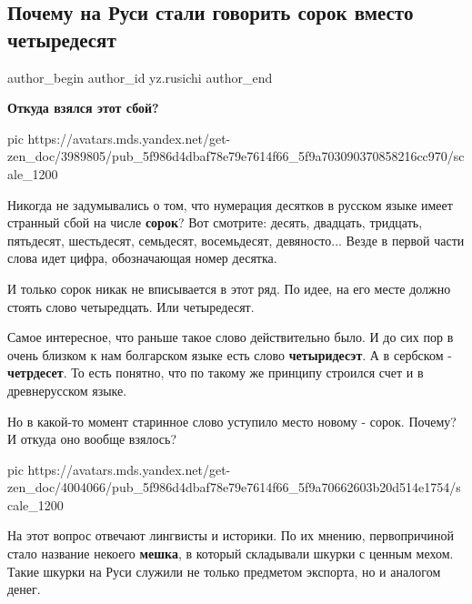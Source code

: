 
 
 
 
 
 
\subsection{Почему на Руси стали говорить сорок вместо четыредесят}
\label{sec:29_10_2020.sites.ru.zen_yandex.yz.rusichi.1.russia_sorok_pochemu}
\ifcmt
	author_begin
   author_id yz.rusichi
	author_end
\fi

{\bfseries 
Откуда взялся этот сбой?
}

\ifcmt
pic https://avatars.mds.yandex.net/get-zen_doc/3989805/pub_5f986d4dbaf78e79e7614f66_5f9a703090370858216cc970/scale_1200
\fi

Никогда не задумывались о том, что нумерация десятков в русском языке имеет
странный сбой на числе \textbf{сорок}? Вот смотрите: десять, двадцать, тридцать,
пятьдесят, шестьдесят, семьдесят, восемьдесят, девяносто... Везде в первой
части слова идет цифра, обозначающая номер десятка.

И только сорок никак не вписывается в этот ряд. По идее, на его месте должно
стоять слово четыредцать. Или четыредесят.

Самое интересное, что раньше такое слово действительно было. И до сих пор в
очень близком к нам болгарском языке есть слово \textbf{четыридесэт}. А в сербском -
\textbf{четрдесет}. То есть понятно, что по такому же принципу строился счет и в
древнерусском языке.

Но в какой-то момент старинное слово уступило место новому - сорок. Почему? И
откуда оно вообще взялось?

\ifcmt
pic https://avatars.mds.yandex.net/get-zen_doc/4004066/pub_5f986d4dbaf78e79e7614f66_5f9a70662603b20d514e1754/scale_1200
\fi

На этот вопрос отвечают лингвисты и историки. По их мнению, первопричиной стало
название некоего \textbf{мешка}, в который складывали шкурки с ценным мехом. Такие
шкурки на Руси служили не только предметом экспорта, но и аналогом денег.

